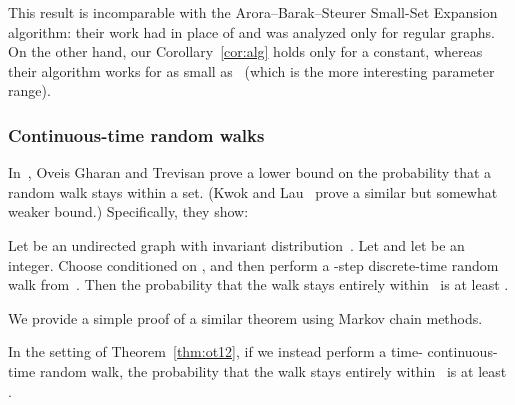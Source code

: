 \documentclass[11pt]{article}
\begin{document}
This result is incomparable with the Arora--Barak--Steurer Small-Set Expansion algorithm: their work had  in place of  and was analyzed only for regular graphs. On the other hand, our Corollary~\ref{cor:alg} holds only for  a constant, whereas their algorithm works for  as small as~ (which is the more interesting parameter range).

\subsubsection{Continuous-time random walks}
In~\cite{OT12}, Oveis Gharan and Trevisan prove a lower bound on the probability that a random walk stays within a set. (Kwok and Lau~\cite{KL12} prove a similar but somewhat weaker bound.)  Specifically, they show:
\begin{theorem} \label{thm:ot12}
    Let  be an undirected graph with invariant distribution~.  Let  and let  be an integer.  Choose  conditioned on , and then perform a -step discrete-time random walk from~.  Then the probability that the walk stays entirely within~ is at least .
\end{theorem}

We provide a simple proof of a similar theorem using Markov chain methods.

\begin{theorem}
\label{thm:cont_rand_walk}
In the setting of Theorem~\ref{thm:ot12}, if we instead perform a time- continuous-time random walk, the probability that the walk stays entirely within~ is at least .
\end{theorem}
\end{document}
